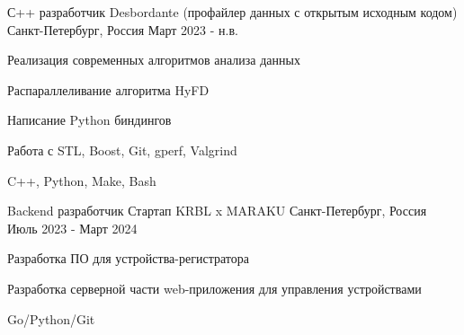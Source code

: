 

\begin{cventries}

  \cventry
    {С++ разработчик} %
    {Desbordante (профайлер данных с открытым исходным кодом)} %
    {Санкт-Петербург, Россия} %
    {Март 2023 - н.в.} %
    {
      \begin{cvitems} %
        \item {Реализация современных алгоритмов анализа данных}
        \item {Распараллеливание алгоритма HyFD}
        \item {Написание Python биндингов}
        \item {Работа с STL, Boost, Git, gperf, Valgrind}
        \item {C++, Python, Make, Bash}
      \end{cvitems}
    }

  \cventry
    {Backend разработчик} %
    {Стартап KRBL x MARAKU} %
    {Санкт-Петербург, Россия} %
    {Июль 2023 - Март 2024} %
    {
      \begin{cvitems} %
        \item {Разработка ПО для устройства-регистратора}
        \item {Разработка серверной части web-приложения для управления устройствами}
        \item {Go/Python/Git}
      \end{cvitems}
    }

\end{cventries}
